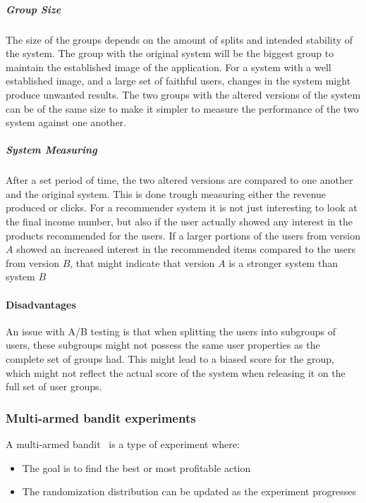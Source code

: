 \subparagraph{Group Size}
\label{par:group_size}

The size of the groups depends on the amount of splits and intended stability
of the system.  The group with the original system will be the biggest group to
maintain the established image of the application.  For a system with a well
established image, and a large set of faithful users, changes in the system
might produce unwanted results.  The two groups with the altered versions of
the system can be of the same size to make it simpler to measure the
performance of the two system against one another.

\subparagraph{System Measuring}
\label{par:system_measuring}

After a set period of time, the two altered versions are compared to one
another and the original system.  This is done trough measuring either the
revenue produced or clicks.  For a recommender system it is not just
interesting to look at the final income number, but also if the user actually
showed any interest in the products recommended for the users.  If a larger
portions of the users from version $A$ showed an increased interest in the
recommended items compared to the users from version $B$, that might indicate
that version $A$ is a stronger system than system $B$

\paragraph{Disadvantages}

An issue with A/B testing is that when splitting the users into subgroups of
users, these subgroups might not possess the same user properties as the
complete set of groups had.  This might lead to a biased score for the group,
which might not reflect the actual score of the system when releasing it on the
full set of user groups.


\subsubsection{Multi-armed bandit experiments}

A multi-armed bandit~\cite{googlebandit} is a type of experiment where:

\begin{itemize}
	\item The goal is to find the best or most profitable action
	\item The randomization distribution can be updated as the experiment progresses
\end{itemize}

